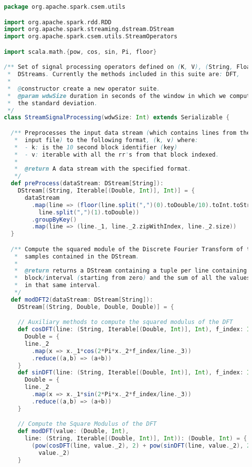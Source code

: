 \begin{lstlisting}[language=Scala,caption={Implementation of the \texttt{HRVBands} algorithm.},label=code:hrvbands]
package org.apache.spark.csem.utils

import org.apache.spark.rdd.RDD
import org.apache.spark.streaming.dstream.DStream
import org.apache.spark.csem.utils.StreamOperators

import scala.math.{pow, cos, sin, Pi, floor}

/** Set of signal processing operators defined on (K, V), (String, Float) 
 *  DStreams. Currently the methods included in this suite are: DFT,
 *
 *  @constructor create a new operator suite. 
 *  @param wdwSize duration in seconds of the window in which we compute
 *  the standard deviation.
 */
class StreamSignalProcessing(wdwSize: Int) extends Serializable {

  /** Preprocesses the input data stream (which contains lines from the csv
   *  input file) to the following format, (k, v) where:
   *  - k: is the 10 second block identifier (key)
   *  - v: iterable with all the rr's from that block indexed.
   *
   *  @return A data stream with the specified format.
   */
  def preProcess(dataStream: DStream[String]):
    DStream[(String, Iterable[(Double, Int)], Int)] = {
      dataStream
        .map(line => (floor(line.split(",")(0).toDouble/10).toInt.toString,
          line.split(",")(1).toDouble))
        .groupByKey()
        .map(line => (line._1, line._2.zipWithIndex, line._2.size))
  }

  /** Compute the squared module of the Discrete Fourier Transform of the 
   *  samples contained in the DStream.
   *
   *  @return returns a DStream containing a tuple per line containing the time
   *  block/interval (starting from zero) and the sum of all the values
   *  in that same interval.
   */
  def modDFT2(dataStream: DStream[String]):
    DStream[(String, Double, Double, Double)] = { 

    // Auxiliary methods to compute the squared modulus of the DFT
    def cosDFT(line: (String, Iterable[(Double, Int)], Int), f_index: Int):
      Double = {
      line._2
        .map(x => x._1*cos(2*Pi*x._2*f_index/line._3))
        .reduce((a,b) => (a+b))
    }
    def sinDFT(line: (String, Iterable[(Double, Int)], Int), f_index: Int):
      Double = {
      line._2
        .map(x => x._1*sin(2*Pi*x._2*f_index/line._3))
        .reduce((a,b) => (a+b))
    }

    // Compute the Square Modulus of the DFT
    def modDFT(value: (Double, Int),
      line: (String, Iterable[(Double, Int)], Int)): (Double, Int) = {
        (pow(cosDFT(line, value._2), 2) + pow(sinDFT(line, value._2), 2),
          value._2)
    }


\end{lstlisting}
